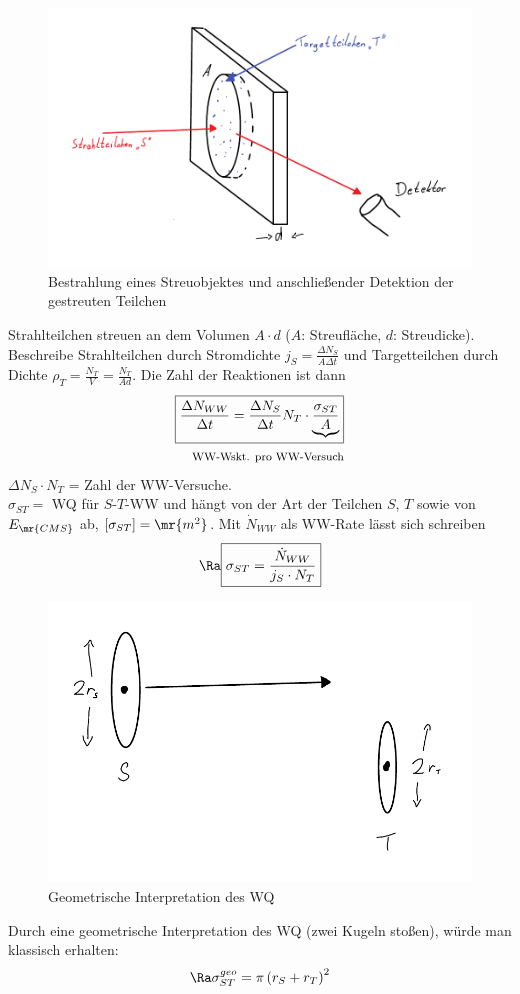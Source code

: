 \begin{figure}[!ht]
\centering
\includegraphics[width=.5\textwidth]{imgs/ep5-fig-3-1.pdf}
\caption{Bestrahlung eines Streuobjektes und anschließender Detektion der gestreuten Teilchen}
\end{figure}
Strahlteilchen streuen an dem Volumen $A\cdot d$ ($A$: Streufläche, $d$: Streudicke). Beschreibe Strahlteilchen durch Stromdichte $j_S= \frac{\Delta N_S}{A\Delta t}$ und Targetteilchen durch Dichte $\rho_T =\frac{N_T}{V}= \frac{N_T}{Ad}$. Die Zahl der Reaktionen ist dann
\begin{align}
\boxed{\frac{\Delta N_{WW}}{\Delta t} = \frac{\Delta N_S}{\Delta t}N_T \cdot \underbrace{\frac{\sigma_{ST}}{A}}}\\
\text{\footnotesize WW-Wskt. pro WW-Versuch} \nonumber
\end{align}
$\Delta N_S \cdot N_T $ = Zahl der WW-Versuche.\\
$\sigma_{ST} = $ WQ für $S$-$T$-WW und hängt von der Art der Teilchen $S$, $T$ sowie von $E_\mr{CMS}$ ab, $\left[\sigma_{ST}\right] = \mr{m^2}$. Mit $\dot{N}_{WW}$ als WW-Rate lässt sich schreiben
\begin{align}
\Ra \boxed{ \sigma_{ST} = \frac{\dot{N}_{WW}}{j_S\cdot N_T} }
\end{align}
\begin{figure}[!ht]
\captionsetup{type=figure}
\centering
\includegraphics[width=.5\textwidth]{imgs/ep5-fig-3-2.pdf}
\caption{Geometrische Interpretation des WQ}
\end{figure}
Durch eine geometrische Interpretation des WQ (zwei Kugeln stoßen), würde man klassisch erhalten:
\begin{align}
\Ra \sigma_{ST}^{geo}= \pi \left( r_S + r_T\right)^2
\end{align}
